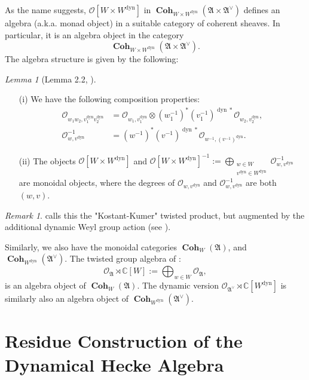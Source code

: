 \documentclass[a4paper]{report}
\theoremstyle{theorem}
\theoremstyle{definition}
\theoremstyle{remark}
\newtheorem{remark}{Remark}
\theoremstyle{proposition}
\theoremstyle{conjecture}
\theoremstyle{lemma}
\newtheorem{lemma}{Lemma}
\theoremstyle{corollary}
\theoremstyle{exercise}
\theoremstyle{example}
\newcommand{\C}{\mathbb{C}}
\newcommand{\mcal}{\mathcal}
\newcommand{\on}{\operatorname}
\newcommand{\coh}{\on{\mathbf{Coh}}}
\newcommand{\dyn}{{\on{dyn}}}
\begin{document}
  As the name suggests, $\mcal{O}[W\times W^\dyn]$ in $\coh_{W\times W^\dyn}(\mathfrak{A} \times \mathfrak{A}^\vee)$
  defines an algebra (a.k.a. monad object) in a suitable category of coherent sheaves. In particular, it is 
  an algebra object in the category 
  $$\coh_{W \times W^\dyn}(\mathfrak{A} \times \mathfrak{A}^\vee).$$
  The algebra structure is given by the following:
  
  \begin{lemma}[Lemma 2.2, \cite{LZZ23}]
      \leavevmode
      \begin{itemize}
          \item[(i)] We have the following composition properties:
              \begin{align*}
                  \mcal{O}_{w_1w_2, v_1^\dyn v_2^\dyn} &= \mcal{O}_{w_1,v_1^\dyn} \otimes (w_1^{-1})^\ast (v_1^{-1})^{\dyn\ast} \mcal{O}_{w_2,v_2^\dyn},\\
                  \mcal{O}_{w,v^\dyn}^{-1} &= (w^{-1})^\ast (v^{-1})^{\dyn\ast}\mcal{O}_{w^{-1},(v^{-1})^\dyn}.
              \end{align*}
          \item[(ii)] The objects $\mcal{O}[W\times W^\dyn]$ 
              and $\mcal{O}[W\times W^\dyn]^{-1} := \bigoplus_{\substack{w\in W\\v^\dyn \in W^\dyn}} \mcal{O}_{w,v^\dyn}^{-1}$ are 
              monoidal objects, where the degrees of $\mcal{O}_{w,v^\dyn}$
              and $\mcal{O}_{w,v^\dyn}^{-1}$ are both $(w,v)$.
      \end{itemize}
  \end{lemma}
  
  \begin{remark}
      \cite{LZZ23} calls this the "Kostant-Kumer" twisted product, but augmented by the 
      additional dynamic Weyl group action (see \cite[\S 2.6]{LZZ23}).
  \end{remark}
  
  Similarly, we also have the monoidal categories $\coh_W(\mathfrak{A})$, and 
  $\coh_{W^\dyn}(\mathfrak{A}^\vee)$. The twisted group algebra of 
  \cite{gkv95}:
  $$\mcal{O}_{\mathfrak{A}} \rtimes \C[W] := \bigoplus_{w\in W} \mcal{O}_{\mathfrak{A}},$$
  is an algebra object of $\coh_W(\mathfrak{A})$. The dynamic version 
  $\mcal{O}_{\mathfrak{A}^\vee} \rtimes \C[W^\dyn]$ is similarly also an 
  algebra object of $\coh_{W^\dyn}(\mathfrak{A}^\vee)$.
  
  \section{Residue Construction of the Dynamical Hecke Algebra}
  
\end{document}
